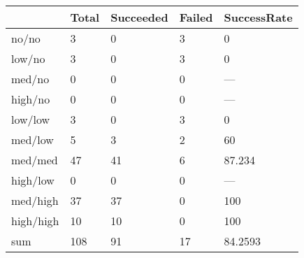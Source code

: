 \begin{tabular}{lllll}
& Total & Succeeded & Failed & SuccessRate \\ 
\hline 
no/no & 3 & 0 & 3 & 0 \\ 
low/no & 3 & 0 & 3 & 0 \\ 
med/no & 0 & 0 & 0 & --- \\ 
high/no & 0 & 0 & 0 & --- \\ 
low/low & 3 & 0 & 3 & 0 \\ 
med/low & 5 & 3 & 2 & 60 \\ 
med/med & 47 & 41 & 6 & 87.234 \\ 
high/low & 0 & 0 & 0 & --- \\ 
med/high & 37 & 37 & 0 & 100 \\ 
high/high & 10 & 10 & 0 & 100 \\ 
sum & 108 & 91 & 17 & 84.2593 \\ 
\hline 
\end{tabular}